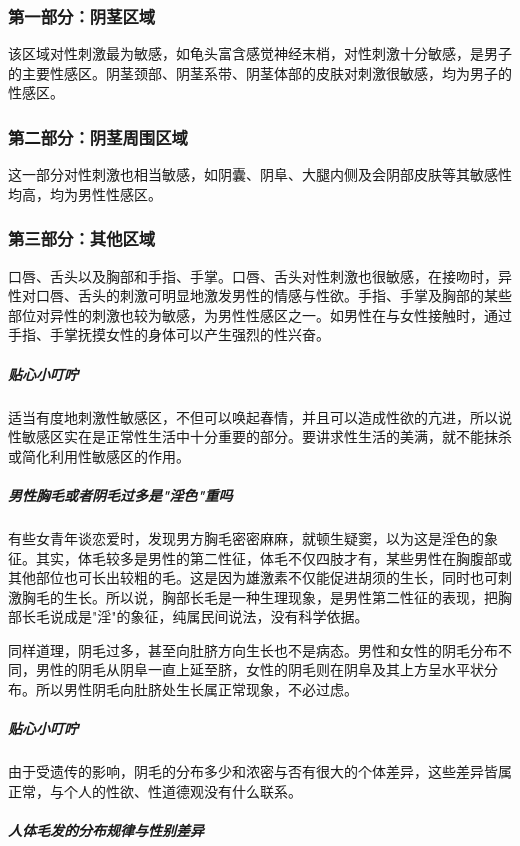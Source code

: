 \subsubsection{第一部分：阴茎区域}

该区域对性刺激最为敏感，如龟头富含感觉神经末梢，对性刺激十分敏感，是男子的主要性感区。阴茎颈部、阴茎系带、阴茎体部的皮肤对刺激很敏感，均为男子的性感区。

\subsubsection{第二部分：阴茎周围区域}

这一部分对性刺激也相当敏感，如阴囊、阴阜、大腿内侧及会阴部皮肤等其敏感性均高，均为男性性感区。

\subsubsection{第三部分：其他区域}

口唇、舌头以及胸部和手指、手掌。口唇、舌头对性刺激也很敏感，在接吻时，异性对口唇、舌头的刺激可明显地激发男性的情感与性欲。手指、手掌及胸部的某些部位对异性的刺激也较为敏感，为男性性感区之一。如男性在与女性接触时，通过手指、手掌抚摸女性的身体可以产生强烈的性兴奋。

\subparagraph{贴心小叮咛}

适当有度地刺激性敏感区，不但可以唤起春情，并且可以造成性欲的亢进，所以说性敏感区实在是正常性生活中十分重要的部分。要讲求性生活的美满，就不能抹杀或简化利用性敏感区的作用。

\subparagraph{男性胸毛或者阴毛过多是"淫色"重吗}

有些女青年谈恋爱时，发现男方胸毛密密麻麻，就顿生疑窦，以为这是淫色的象征。其实，体毛较多是男性的第二性征，体毛不仅四肢才有，某些男性在胸腹部或其他部位也可长出较粗的毛。这是因为雄激素不仅能促进胡须的生长，同时也可刺激胸毛的生长。所以说，胸部长毛是一种生理现象，是男性第二性征的表现，把胸部长毛说成是"淫"的象征，纯属民间说法，没有科学依据。

同样道理，阴毛过多，甚至向肚脐方向生长也不是病态。男性和女性的阴毛分布不同，男性的阴毛从阴阜一直上延至脐，女性的阴毛则在阴阜及其上方呈水平状分布。所以男性阴毛向肚脐处生长属正常现象，不必过虑。

\subparagraph{贴心小叮咛}

由于受遗传的影响，阴毛的分布多少和浓密与否有很大的个体差异，这些差异皆属正常，与个人的性欲、性道德观没有什么联系。

\subparagraph{人体毛发的分布规律与性别差异}

